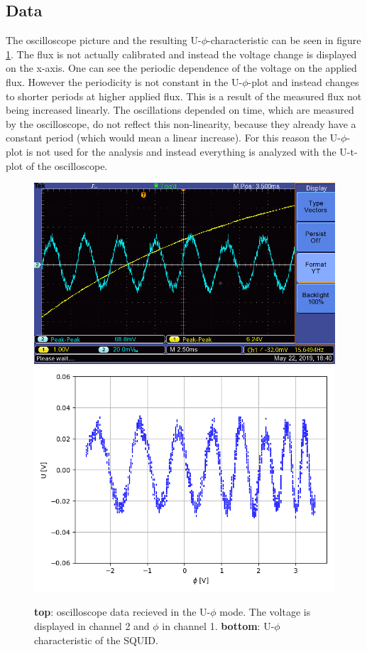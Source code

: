 \documentclass[12pt,a4paper]{article}
\begin{document}
\subsection{Data}
The oscilloscope picture and the resulting U-$\si{\phi}$-characteristic can be seen in figure \ref{fig:U-phi_data}. The flux is not actually calibrated and instead the voltage change is displayed on the x-axis. One can see the periodic dependence of the voltage on the applied flux. However the periodicity is not constant in the U-$\si{\phi}$-plot and instead changes to shorter periods at higher applied flux. This is a result of the measured flux not being increased linearly. The oscillations depended on time, which are measured by the oscilloscope, do not reflect this non-linearity, because they already have a constant period (which would mean a linear increase). For this reason the U-$\phi$-plot is not used for the analysis and instead everything is analyzed with the U-t-plot of the oscilloscope.

\begin{figure}
\centering
\includegraphics[scale=0.6]{Bilder/U_phi/oszi.png}
\includegraphics[scale=0.8]{Bilder/U_phi/data.png}
\caption{\textbf{top}: oscilloscope data recieved in the U-$\phi$ mode. The voltage is displayed in channel 2 and $\phi$ in channel 1. \textbf{bottom}: U-$\phi$ characteristic of the SQUID.}
\label{fig:U-phi_data}
\end{figure}
\end{document}
